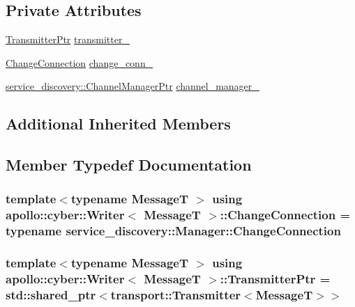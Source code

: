 \subsection*{Private Attributes}
\begin{DoxyCompactItemize}
\item 
\hyperlink{classapollo_1_1cyber_1_1Writer_ab3727d9c195176d7f609546547ac44c4}{Transmitter\-Ptr} \hyperlink{classapollo_1_1cyber_1_1Writer_a0aba4d006319cb00a54999abbdb22395}{transmitter\-\_\-}
\item 
\hyperlink{classapollo_1_1cyber_1_1Writer_ae6361e75e6d02a260e53caa52d16d9e2}{Change\-Connection} \hyperlink{classapollo_1_1cyber_1_1Writer_ab63e17387ddc574686cfcae2864e766a}{change\-\_\-conn\-\_\-}
\item 
\hyperlink{namespaceapollo_1_1cyber_1_1service__discovery_a12c2dfc39551ef96e3110dae235ab609}{service\-\_\-discovery\-::\-Channel\-Manager\-Ptr} \hyperlink{classapollo_1_1cyber_1_1Writer_a653e7f4679f7849d9d523f27997baa54}{channel\-\_\-manager\-\_\-}
\end{DoxyCompactItemize}
\subsection*{Additional Inherited Members}


\subsection{Member Typedef Documentation}
\hypertarget{classapollo_1_1cyber_1_1Writer_ae6361e75e6d02a260e53caa52d16d9e2}{
\subsubsection[{Change\-Connection}]{\setlength{\rightskip}{0pt plus 5cm}template$<$typename Message\-T $>$ using {\bf apollo\-::cyber\-::\-Writer}$<$ Message\-T $>$\-::{\bf Change\-Connection} =  typename {\bf service\-\_\-discovery\-::\-Manager\-::\-Change\-Connection}}}\label{classapollo_1_1cyber_1_1Writer_ae6361e75e6d02a260e53caa52d16d9e2}
\hypertarget{classapollo_1_1cyber_1_1Writer_ab3727d9c195176d7f609546547ac44c4}{
\subsubsection[{Transmitter\-Ptr}]{\setlength{\rightskip}{0pt plus 5cm}template$<$typename Message\-T $>$ using {\bf apollo\-::cyber\-::\-Writer}$<$ Message\-T $>$\-::{\bf Transmitter\-Ptr} =  std\-::shared\-\_\-ptr$<${\bf transport\-::\-Transmitter}$<$Message\-T$>$$>$}}\label{classapollo_1_1cyber_1_1Writer_ab3727d9c195176d7f609546547ac44c4}


